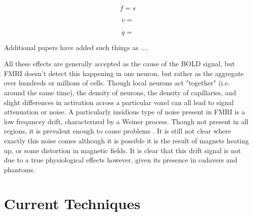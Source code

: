 \documentclass{article}
\begin{document}
\begin{equation}
\dot{f} = s
\end{equation}

\begin{equation}
\dot{v} = 
\end{equation}

\begin{equation}
\dot{q} = 
\end{equation}

Additional papers have added such things as
....

All these effects are generally accepted as the cause of the BOLD signal, 
but FMRI doesn't detect this happening in one neuron, but rather as the 
aggregate over hundreds or millions of cells. Though local neurons act
"together" (i.e. around the same time), the density of neurons, the
density of capillaries, and slight differences in activation across 
a particular voxel can all lead to signal attenuation or noise. 
A particularly insidious type of noise present in FMRI is a low frequncey
drift, characterized by a Weiner process. Though not present in all
regions, it is prevalent enough to cause problems \cite{detrend}. It is still not
clear where exactly this noise comes although it is possible it is 
the result of magnets heating up, or some distortion in magnetic
fields. It is clear that this drift signal is not due to a true physiological
effects however, given its presence in cadavers and phantoms\cite{drift}.

\section*{Current Techniques}
\end{document}
